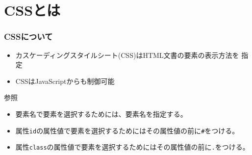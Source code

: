 

\frame{\maketitle}
\section{CSSとは}
\begin{frame}[containsverbatim]
 \frametitle{CSSについて}
 \begin{itemize}
  \item カスケーディングスタイルシート(CSS)はHTML文書の要素の表示方法を
        指定
  \item CSSはJavaScriptからも制御可能
 \end{itemize}
 参照
\begin{itemize}
 \item 要素名で要素を選択するためには、要素名を指定する。
 \item 属性\texttt{id}の属性値で要素を選択するためにはその属性値の前に\texttt{\#}をつける。
 \item 属性\texttt{class}の属性値で要素を選択するためにはその属性値の前に\texttt{.}をつける。
\end{itemize}
 \end{frame}
